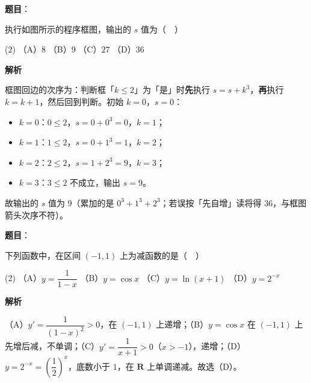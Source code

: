 \begin{answer}

\textbf{题目}：

执行如图所示的程序框图，输出的 \(s\) 值为（　）
\nopagebreak[4]
\begin{center}\end{center}
\nopagebreak[4]
\begin{gkopts}(2)
\task （A）\(8\)
\task （B）\(9\)
\task （C）\(27\)
\task （D）\(36\)
\end{gkopts}

\textbf{解析}

框图回边的次序为：判断框「\(k\leqslant2\)」为「是」时\textbf{先}执行 \(s=s+k^{3}\)，\textbf{再}执行 \(k=k+1\)，然后回到判断。初始 \(k=0\)，\(s=0\)：

\begin{itemize}
\item \(k=0\)：\(0\leqslant2\)，\(s=0+0^{3}=0\)，\(k=1\)；
\item \(k=1\)：\(1\leqslant2\)，\(s=0+1^{3}=1\)，\(k=2\)；
\item \(k=2\)：\(2\leqslant2\)，\(s=1+2^{3}=9\)，\(k=3\)；
\item \(k=3\)：\(3\leqslant2\) 不成立，输出 \(s=9\)。
\end{itemize}

故输出的 \(s\) 值为 \(9\)（累加的是 \(0^{3}+1^{3}+2^{3}\)；若误按「先自增」读将得 \(36\)，与框图箭头次序不符）。


\end{answer}
\begin{answer}

\textbf{题目}：

下列函数中，在区间 \((-1,1)\) 上为减函数的是（　）

\begin{gkopts}(2)
\task （A）\(y=\dfrac{1}{1-x}\)
\task （B）\(y=\cos x\)
\task （C）\(y=\ln(x+1)\)
\task （D）\(y=2^{-x}\)
\end{gkopts}

\textbf{解析}

（A）\(y'=\dfrac{1}{(1-x)^{2}}>0\)，在 \((-1,1)\) 上递增；（B）\(y=\cos x\) 在 \((-1,1)\) 上先增后减，不单调；（C）\(y'=\dfrac{1}{x+1}>0\)（\(x>-1\)），递增；（D）\(y=2^{-x}=\left(\dfrac12\right)^x\)，底数小于 \(1\)，在 \(\mathbf{R}\) 上单调递减。故选（D）。


\end{answer}
